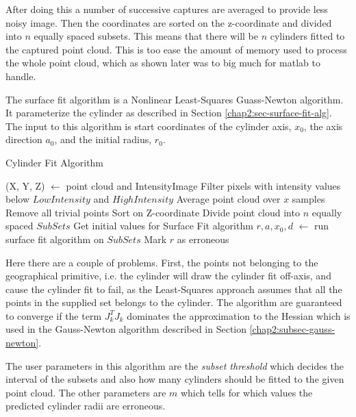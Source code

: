 After doing this a number of successive captures are averaged to provide less noisy image.
Then the coordinates are sorted on the z-coordinate and divided into $n$ equally spaced
subsets. This means that there will be $n$ cylinders fitted to the captured point cloud.
This is too ease the amount of memory used to process the whole point cloud, which as
shown later was to big much for matlab to handle. 

The surface fit algorithm is a Nonlinear Least-Squares Guass-Newton algorithm. It parameterize the
cylinder as described in Section \ref{chap2:sec-surface-fit-alg}. The input to this
algorithm is start coordinates of the cylinder axis, $x_0$, the axis direction $a_0$, and
the initial radius, $r_0$.

\begin{algorithm}[htbp]
    \caption{Cylinder Fit Algorithm}
    \label{chap5:alg-cylinderfit}
    \begin{algorithmic}
        \REQUIRE (X, Y, Z) $\leftarrow$ point cloud and IntensityImage
        \STATE Filter pixels with intensity values below $LowIntensity$ and $HighIntensity$
        \STATE Average point cloud over $x$ samples
        \STATE Remove all trivial points
        \STATE Sort on Z-coordinate
        \STATE Divide point cloud into $n$ equally spaced $SubSets$
            \STATE Get initial values for Surface Fit algorithm
            \STATE  $r, a, x_0, d$ $\leftarrow$ run surface fit algorithm on $SubSets$
        \ENDFOR
                \STATE Mark $r$ as erroneous
            \ENDIF
        \ENDFOR
    \end{algorithmic}
\end{algorithm}

Here there are a couple of problems. First, the points not belonging to the geographical
primitive, i.e. the cylinder will draw the cylinder fit off-axis, and cause the cylinder
fit to fail, as the Least-Squares approach assumes that all the points in the supplied set
belongs to the cylinder. The algorithm are guaranteed to converge if the term $J_k^T J_k$
dominates the approximation to the Hessian which is used in the Gauss-Newton algorithm
described in Section \ref{chap2:subsec-gauss-newton}. \cite{optreg}

The user parameters in this algorithm are the \emph{subset threshold} which decides the interval
of the subsets and also how many cylinders should be fitted to the given point cloud. The
other parameters are $m$ which tells for which values the predicted cylinder radii are
erroneous. 

